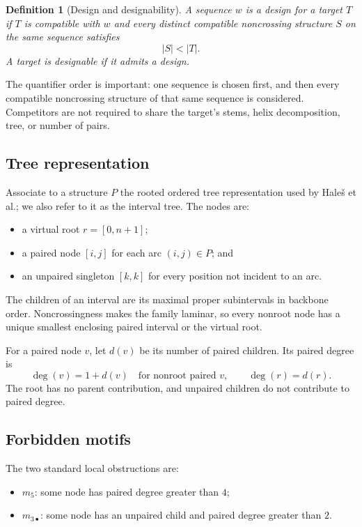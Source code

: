 \documentclass[11pt]{article}
\newtheorem{definition}[theorem]{Definition}
\begin{document}
\begin{definition}[Design and designability]
A sequence $w$ is a \emph{design} for a target $T$ if $T$ is compatible with $w$ and every distinct compatible noncrossing structure $S$ on the same sequence satisfies
\[
|S|<|T|.
\]
A target is \emph{designable} if it admits a design.
\end{definition}

The quantifier order is important: one sequence is chosen first, and then every compatible noncrossing structure of that same sequence is considered.  Competitors are not required to share the target's stems, helix decomposition, tree, or number of pairs.

\subsection{Tree representation}

Associate to a structure $P$ the rooted ordered tree representation used by Hale\v{s} et al.; we also refer to it as the interval tree.  The nodes are:
\begin{itemize}
\item a virtual root $r=[0,n+1]$;
\item a paired node $[i,j]$ for each arc $(i,j)\in P$; and
\item an unpaired singleton $[k,k]$ for every position not incident to an arc.
\end{itemize}
The children of an interval are its maximal proper subintervals in backbone order.  Noncrossingness makes the family laminar, so every nonroot node has a unique smallest enclosing paired interval or the virtual root.

For a paired node $v$, let $d(v)$ be its number of paired children.  Its paired degree is
\[
\deg(v)=1+d(v)\quad\text{for nonroot paired }v,
\qquad
\deg(r)=d(r).
\]
The root has no parent contribution, and unpaired children do not contribute to paired degree.

\subsection{Forbidden motifs}

The two standard local obstructions are:
\begin{itemize}
\item $m_5$: some node has paired degree greater than $4$;
\item $m_{3\bullet}$: some node has an unpaired child and paired degree greater than $2$.
\end{itemize}
\end{document}
